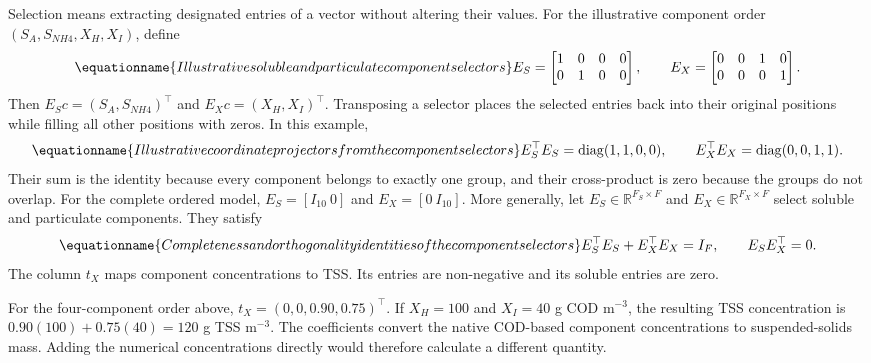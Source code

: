 Selection means extracting designated entries of a vector without altering their values. For the illustrative component order $(S_A,S_{NH4},X_H,X_I)$, define
\begin{equation}
\equationname{Illustrative soluble and particulate component selectors}
E_S=\begin{bmatrix}1&0&0&0\\0&1&0&0\end{bmatrix},\qquad
E_X=\begin{bmatrix}0&0&1&0\\0&0&0&1\end{bmatrix}.
\end{equation}
Then $E_Sc=(S_A,S_{NH4})^\top$ and $E_Xc=(X_H,X_I)^\top$. Transposing a selector places the selected entries back into their original positions while filling all other positions with zeros. In this example,
\begin{equation}
\equationname{Illustrative coordinate projectors from the component selectors}
E_S^\top E_S=\operatorname{diag}(1,1,0,0),\qquad
E_X^\top E_X=\operatorname{diag}(0,0,1,1).
\end{equation}
Their sum is the identity because every component belongs to exactly one group, and their cross-product is zero because the groups do not overlap. For the complete ordered model, $E_S=[I_{10}\ 0]$ and $E_X=[0\ I_{10}]$. More generally, let $E_S\in\mathbb R^{F_S\times F}$ and $E_X\in\mathbb R^{F_X\times F}$ select soluble and particulate components. They satisfy
\begin{equation}
\equationname{Completeness and orthogonality identities of the component selectors}
E_S^\top E_S+E_X^\top E_X=I_F,\qquad E_SE_X^\top=0.
\end{equation}
The column $t_X$ maps component concentrations to TSS. Its entries are non-negative and its soluble entries are zero.

For the four-component order above, $t_X=(0,0,0.90,0.75)^\top$. If $X_H=100$ and $X_I=40$ g COD m$^{-3}$, the resulting TSS concentration is $0.90(100)+0.75(40)=120$ g TSS m$^{-3}$. The coefficients convert the native COD-based component concentrations to suspended-solids mass. Adding the numerical concentrations directly would therefore calculate a different quantity.

